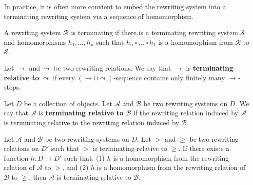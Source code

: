    In practice, it is often more convient to embed the rewriting system into a terminating rewriting system via a sequence of homomorphism.
    \begin{corollary}
      A rewriting system $\mathcal{R}$ is terminating if there is a terminating rewriting system $\mathcal{S}$ and homomorphisms $h_1,\ldots, h_n$ such that $h_n \circ \ldots \circ h_1$ is a homomorphism from $\mathcal{R}$ to $\mathcal{S}$.
    \end{corollary}
    
    \begin{definition}
        \label{def:rewriting_relation:relative_termination}
        Let \( \to \) and \( \leadsto \) be two rewriting relations. We say that \(\to\) is \textbf{terminating relative to} \(\leadsto\) if every \( \left(\to \cup \leadsto \right) \)-sequence contains only finitely many \(\to\)-steps.
    \end{definition}
    
    \begin{definition}
        \label{def:rewriting_system:relative_termination}
        Let $D$ be a collection of objects.
        Let \( \mathcal{A} \) and \( \mathcal{B} \) be two rewriting systems on $D$. We say that \(\mathcal{A}\) is \textbf{terminating relative to} \(\mathcal{B}\) if the rewriting relation induced by \(\mathcal{A}\) is terminating relative to the rewriting relation induced by \(\mathcal{B}\).
    \end{definition}
    
    \begin{definition}
        \label{def:rewriting_system:proving_relative_termination}
        Let \( \mathcal{A} \) and \( \mathcal{B} \) be two rewriting systems on $D$. Let $>$ and $\geq$ be two rewriting relations on $D'$ such that $>$ is terminating relative to $\geq$. If there exists a function $h : D \to D'$ such that: (1) $h$ is a homomorphism from the rewriting relation of \(\mathcal{A}\) to $>$, and (2) $h$ is a homomorphism from the rewriting relation of \(\mathcal{B}\) to $\geq$, then \(\mathcal{A}\) is terminating relative to \(\mathcal{B}\).
    \end{definition}
    
